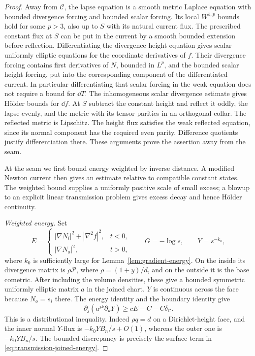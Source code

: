 \begin{proof}
Away from $\mathcal C$, the lapse equation is a smooth metric Laplace
equation with bounded divergence forcing and bounded scalar forcing.
Its local $W^{1,p}$ bounds hold for some $p>3$, also up to $S$ with its
natural current flux.  The prescribed constant flux at $S$ can be put in
the current by a smooth bounded extension before reflection.  Differentiating
the divergence height equation gives scalar uniformly elliptic equations
for the coordinate derivatives of $f$.  Their divergence forcing contains
first derivatives of $N$, bounded in $L^p$, and the bounded scalar height
forcing, put into the corresponding component of the differentiated
current.  In particular differentiating that scalar forcing in the weak
equation does not require a bound for $\dd T$.
The inhomogeneous scalar divergence estimate gives H\"older bounds for
$\dd f$.  At $S$ subtract the constant height and reflect it oddly, the
lapse evenly, and the metric with its tensor parities in an orthogonal
collar.  The reflected metric is Lipschitz.  The height flux satisfies the
weak reflected equation, since its normal component has the required even
parity.  Difference quotients justify differentiation there.  These
arguments prove the assertion away from the seam.

At the seam we first bound energy weighted by inverse distance.
A modified Newton current then gives an estimate relative to compatible
constant states. The weighted bound supplies a uniformly positive
scale of small excess; a blowup to an explicit linear transmission
problem gives excess decay and hence H\"older continuity.

\smallskip\noindent\emph{Weighted energy.}
Set
\begin{equation}
 E=\begin{cases}|\nabla N_i|^2+|\nabla^2 f|^2,&t<0,\\
                 |\nabla N_o|^2,&t>0,
   \end{cases}
 \qquad G=-\log s,\qquad Y=s^{-k_0},
 \label{eq:transmission-energy-definition}
\end{equation}
where $k_0$ is sufficiently large for
Lemma~\ref{lem:gradient-energy}.  On the inside its divergence matrix is
$\rho\mathcal P$, where $\rho=(1+y)/d$, and on the outside it is the
base cometric.  After including the volume densities, these give a bounded
symmetric uniformly elliptic matrix $a$ in the joined chart.
$Y$ is continuous across the face because $N_o=s_i$ there.
The energy identity and the boundary identity give
\begin{equation}
 \partial_j(a^{jk}\partial_kY)
 \geq cE-C-C\delta_{\mathcal C}.
 \label{eq:transmission-joined-energy}
\end{equation}
This is a distributional inequality.  Indeed $\rho q=d$ on a
Dirichlet-height face, and the inner normal $Y$-flux is
$-k_0YB_n/s+O(1)$, whereas the outer one is $-k_0YB_n/s$.
The bounded discrepancy is precisely the surface term in
\eqref{eq:transmission-joined-energy}.


\end{proof}
